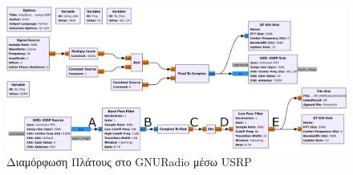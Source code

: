 \documentclass[12pt]{report}
\begin{document}
                \begin{figure}[h]
                    \centering
                    \includegraphics[width=\textwidth]{ex2Flow.png}
                    \caption{Διαμόρφωση Πλάτους στο GNURadio μέσω USRP}
                    \label{img:ex2Flow}                    
                \end{figure}
\end{document}
